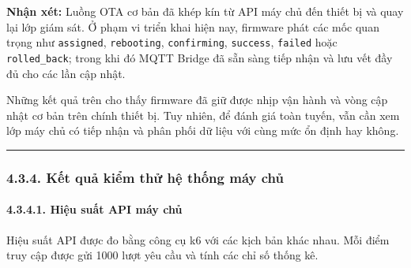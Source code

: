 \documentclass[a4paper]{extarticle}
\begin{document}
\textbf{Nhận xét:} Luồng OTA cơ bản đã khép kín từ API máy chủ đến thiết bị
và quay lại lớp giám sát. Ở phạm vi triển khai hiện nay, firmware phát
các mốc quan trọng như \texttt{assigned}, \texttt{rebooting},
\texttt{confirming}, \texttt{success}, \texttt{failed} hoặc
\texttt{rolled\_back}; trong khi đó MQTT Bridge đã sẵn sàng tiếp nhận và
lưu vết đầy đủ cho các lần cập nhật.

Những kết quả trên cho thấy firmware đã giữ được nhịp vận hành và vòng
cập nhật cơ bản trên chính thiết bị. Tuy nhiên, để đánh giá toàn tuyến,
vẫn cần xem lớp máy chủ có tiếp nhận và phân phối dữ liệu với cùng mức
ổn định hay không.

\begin{center}\rule{0.5\linewidth}{0.5pt}\end{center}

\subsubsection{4.3.4. Kết quả kiểm thử hệ thống máy
chủ}\label{434-kux1ebft-quux1ea3-kiux1ec3m-thux1eed-hux1ec7-thux1ed1ng-cloud}

\paragraph{4.3.4.1. Hiệu suất API máy
chủ}\label{4341-hiux1ec7u-suux1ea5t-api-backend}

Hiệu suất API được đo bằng công cụ k6 với các kịch bản khác nhau. Mỗi
điểm truy cập được gửi 1000 lượt yêu cầu và tính các chỉ số thống kê.
\end{document}
